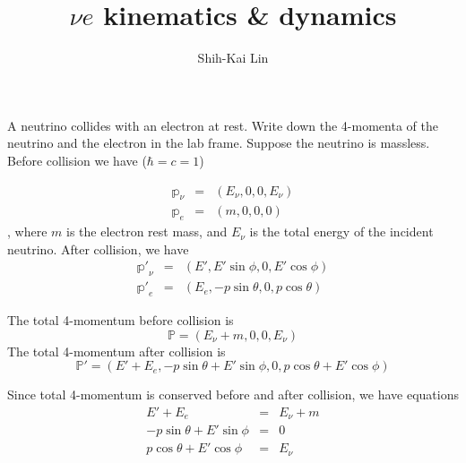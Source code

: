 \documentclass{beamer}
\author{Shih-Kai Lin}
\date{}
\title{\texorpdfstring{$\nu e$}{nu-e} kinematics \& dynamics}
\begin{document}
\begin{frame}
\titlepage
\end{frame}
\begin{frame}[allowframebreaks]{}

\begin{figure}
\centering
\end{figure}


A neutrino collides with an electron at rest. Write down the 4-momenta of the neutrino and the electron in the lab frame. Suppose the neutrino is massless. Before collision we have ($\hbar=c=1$)

\framebreak

\begin{eqnarray}
\mathbb{p}_\nu &=&(E_\nu,0,0,E_\nu) \label{eq:pnu}\\
\mathbb{p}_e&=&(m,0,0,0) \label{eq:pe}
\end{eqnarray}
, where $m$ is the electron rest mass, and $E_\nu$ is the total energy of the incident neutrino.
After collision, we have
\begin{eqnarray}
\mathbb{p'}_\nu &=&(E',E'\sin\phi,0,E'\cos\phi) \label{eq:ppnu} \\
\mathbb{p'}_e &=& (E_e,-p\sin\theta,0,p\cos\theta) \label{eq:ppe}
\end{eqnarray}


The total 4-momentum before collision is
\begin{equation} \label{eq:ptot}
  \mathbb{P} = (E_\nu+m,0,0,E_\nu)
\end{equation}
The total 4-momentum after collision is
\begin{equation} \label{eq:pptot}
  \mathbb{P}' = (E'+E_e,-p\sin\theta+E'\sin\phi,0,p\cos\theta+E'\cos\phi)
\end{equation}

\framebreak

Since total 4-momentum is conserved before and after collision, we have equations
\begin{eqnarray}
  E'+E_e &=& E_\nu+m \label{eq:E} \\
  -p\sin\theta+E'\sin\phi &=& 0 \label{eq:ptotx} \\
  p\cos\theta+E'\cos\phi &=& E_\nu \label{eq:ptotz}
\end{eqnarray}


\end{frame}
\end{document}
